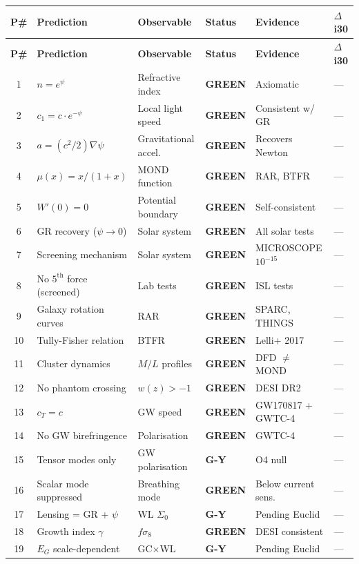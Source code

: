 \documentclass[11pt,a4paper]{article}
\newcommand{\GREEN}{\textcolor{dfdgreen}{\textbf{GREEN}}}
\newcommand{\GY}{\textcolor{dfdgy}{\textbf{G-Y}}}
\begin{document}
\begin{center}
\begin{longtable}{clp{4cm}lll}
\toprule
\textbf{P\#} & \textbf{Prediction} & \textbf{Observable} & \textbf{Status} & \textbf{Evidence} & \textbf{$\Delta$ i30} \\
\midrule
\endfirsthead
\toprule
\textbf{P\#} & \textbf{Prediction} & \textbf{Observable} & \textbf{Status} & \textbf{Evidence} & \textbf{$\Delta$ i30} \\
\midrule
\endhead
1 & $n = e^\psi$ & Refractive index & \GREEN & Axiomatic & --- \\
2 & $c_1 = c \cdot e^{-\psi}$ & Local light speed & \GREEN & Consistent w/ GR & --- \\
3 & $a = (c^2/2)\nabla\psi$ & Gravitational accel. & \GREEN & Recovers Newton & --- \\
4 & $\mu(x) = x/(1+x)$ & MOND function & \GREEN & RAR, BTFR & --- \\
5 & $W'(0) = 0$ & Potential boundary & \GREEN & Self-consistent & --- \\
6 & GR recovery ($\psi \to 0$) & Solar system & \GREEN & All solar tests & --- \\
7 & Screening mechanism & Solar system & \GREEN & MICROSCOPE $10^{-15}$ & --- \\
8 & No $5^\mathrm{th}$ force (screened) & Lab tests & \GREEN & ISL tests & --- \\
9 & Galaxy rotation curves & RAR & \GREEN & SPARC, THINGS & --- \\
10 & Tully-Fisher relation & BTFR & \GREEN & Lelli+ 2017 & --- \\
11 & Cluster dynamics & $M/L$ profiles & \GREEN & DFD $\neq$ MOND & --- \\
12 & No phantom crossing & $w(z) > -1$ & \GREEN & DESI DR2 & --- \\
13 & $c_T = c$ & GW speed & \GREEN & GW170817 + GWTC-4 & --- \\
14 & No GW birefringence & Polarisation & \GREEN & GWTC-4 & --- \\
15 & Tensor modes only & GW polarisation & \GY & O4 null & --- \\
16 & Scalar mode suppressed & Breathing mode & \GREEN & Below current sens. & --- \\
17 & Lensing = GR + $\psi$ & WL $\Sigma_0$ & \GY & Pending Euclid & --- \\
18 & Growth index $\gamma$ & $f\sigma_8$ & \GREEN & DESI consistent & --- \\
19 & $E_G$ scale-dependent & GC$\times$WL & \GY & Pending Euclid & --- \\

\end{longtable}
\end{center}
\end{document}
